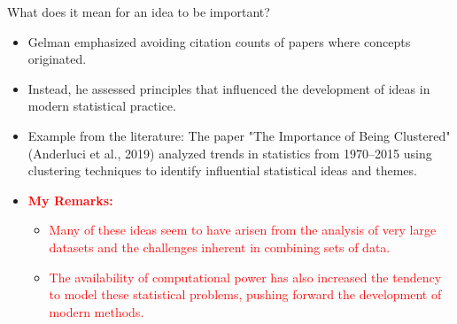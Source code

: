 \documentclass{beamer}
\begin{document}
\begin{frame}{What does it mean for an idea to be important?}
\begin{itemize}
    \item Gelman emphasized avoiding citation counts of papers where concepts originated.
    \item Instead, he assessed principles that influenced the development of ideas in modern statistical practice.
    \item Example from the literature: The paper "The Importance of Being Clustered" (Anderluci et al., 2019) analyzed trends in statistics from 1970–2015 using clustering techniques to identify influential statistical ideas and themes.
\item \textcolor{red}{\textbf{My Remarks:}}
    \begin{itemize}
        \item \textcolor{red}{Many of these ideas seem to have arisen from the analysis of very large datasets and the challenges inherent in combining sets of data.}
        \item \textcolor{red}{The availability of computational power has also increased the tendency to model these statistical problems, pushing forward the development of modern methods.}
    \end{itemize}
\end{itemize}
\end{frame}
\end{document}
